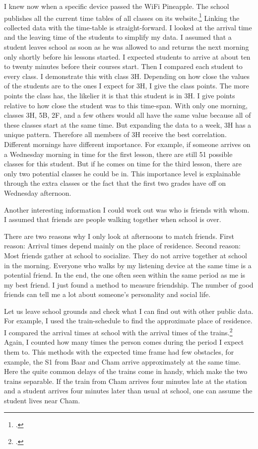 \documentclass[paper=a4, fontsize=11pt]{article}
\begin{document}
I knew now when a specific device passed the WiFi Pineapple. The school publishes all the current time tables of all classes on its website.\footcite{stundenplan}
Linking the collected data with the time-table is straight-forward. I looked at the arrival time and the leaving time of the students to simplify my data. I assumed that a student leaves school as soon as he was allowed to and returns the next morning only shortly before his lessons started. I expected students to arrive at about ten to twenty minutes before their courses start. Then I compared each student to every class. I demonstrate this with class 3H. Depending on how close the values of the students are to the ones I expect for 3H, I give the class points. The more points the class has, the likelier it is that this student is in 3H. I give points relative to how close the student was to this time-span. With only one morning, classes 3H, 5B, 2F, and a few others would all have the same value because all of these classes start at the same time. But expanding the data to a week, 3H has a unique pattern. Therefore all members of 3H receive the best correlation. Different mornings have different importance. For example, if someone arrives on a Wednesday morning in time for the first lesson, there are still 51 possible classes for this student. But if he comes on time for the third lesson, there are only two potential classes he could be in. This importance level is explainable through the extra classes or the fact that the first two grades have off on Wednesday afternoon. 

Another interesting information I could work out was who is friends with whom. I assumed that friends are people walking together when school is over.

There are two reasons why I only look at afternoons to match friends. First reason: Arrival times depend mainly on the place of residence. Second reason: Most friends gather at school to socialize. They do not arrive together at school in the morning. 
Everyone who walks by my listening device at the same time is a potential friend. In the end, the one often seen within the same period as me is my best friend. I just found a method to measure friendship. The number of good friends can tell me a lot about someone's personality and social life.

Let us leave school grounds and check what I can find out with other public data. For example, I used the train-schedule to find the approximate place of residence. I compared the arrival times at school with the arrival times of the trains.\footcite{sbbonlinefahrplan} Again, I counted how many times the person comes during the period I expect them to. This methods with the expected time frame had few obstacles, for example, the S1 from Baar and Cham arrive approximately at the same time. Here the quite common delays of the trains come in handy, which make the two trains separable. If the train from Cham arrives four minutes late at the station and a student arrives four minutes later than usual at school, one can assume the student lives near Cham.
\end{document}
